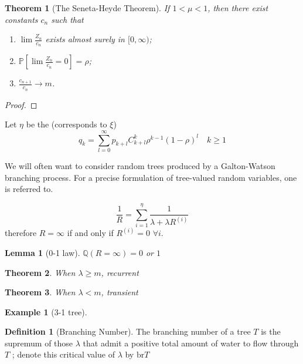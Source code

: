 \documentclass{article}
\newtheorem{Thm}{Theorem}[section]
\newtheorem{Lem}{Lemma}[section]
\newtheorem{Eg}{Example}[section]
\theoremstyle{definition}
\newtheorem{Def}{Definition}[section]
\newcommand{\PP}{\mathbb{P}}
\newcommand{\QQ}{\mathbb{Q}}
\renewcommand{\geq}{\geqslant}
\newcommand{\<}{\left\langle}
\renewcommand{\>}{\right\rangle}
\begin{document}
\begin{Thm}[The Seneta-Heyde Theorem]
    If \(1 < \mu < 1\), then there exist constants \(c_n\) such that
    \begin{enumerate}[label=(\roman*)]
        \item \(\lim \frac{Z_n}{c_n}\) exists almost surely in \([0, \infty)\);
        \item \(\PP[\lim \frac{Z_n}{c_n} = 0] = \rho\);
        \item \(\frac{c_{n+1}}{c_n} \to m\).
    \end{enumerate}

\end{Thm}
\begin{proof}
    
\end{proof}

Let $\eta$ be the (corresponds to $\xi$)
\[q_k=\sum_{l=0}^{\infty} p_{k+l} C_{k+l}^k \rho^{k-1}(1-\rho)^l \quad k\geq 1 \]

We will often want to consider random trees produced by a Galton-Watson branching
process. For a precise formulation of tree-valued random variables, one is referred to.

\[\frac{1}{R}=\sum_{i=1}^{\eta}\frac{1}{\lambda+\lambda R^{(i)}}\]
therefore $R=\infty$ if and only if $R^{(i)}=0$ $\forall i$.

\begin{Lem}[0-1 law]
    $\QQ(R=\infty)=0$ or $1$
\end{Lem}

\begin{Thm}
    When $\lambda\geq m$, recurrent
\end{Thm}



\begin{Thm}
    When $\lambda<m$, transient
\end{Thm}

\begin{Eg}[3-1 tree]
    
\end{Eg}

\begin{Def}[Branching Number]
    The branching number of a tree $T$ is
the supremum of those $\lambda$ that admit a positive total amount of water to flow through $T$ ;
denote this critical value of $\lambda$ by $\text{br} T$
\end{Def}
\end{document}
